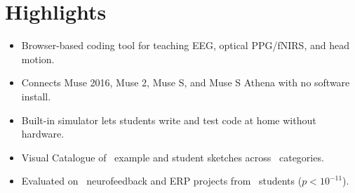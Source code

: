 \documentclass[11pt]{article}
\begin{document}
\section*{Highlights}
\begin{itemize}
\item Browser-based coding tool for teaching EEG, optical PPG/fNIRS, and head motion.
\item Connects Muse 2016, Muse 2, Muse S, and Muse S Athena with no software install.
\item Built-in simulator lets students write and test code at home without hardware.
\item Visual Catalogue of \NCatalogueSketches\ example and student sketches across \NCatalogueCategories\ categories.
\item Evaluated on \NStudentSketches\ neurofeedback and ERP projects from \NUniqueStudents\ students ($p < 10^{-11}$).
\end{itemize}
\end{document}

